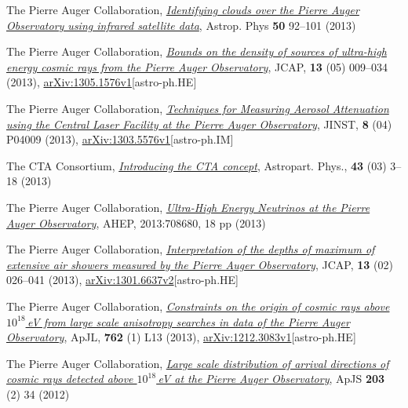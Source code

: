 \begin{etaremune}
\item {}The Pierre Auger Collaboration, \href{http://dx.doi.org/10.1016/j.astropartphys.2013.09.004}{\emph{Identifying clouds over the Pierre Auger Observatory using infrared satellite data}}, Astrop. Phys {\bf{50}} 92--101 (2013)

\item {}The Pierre Auger Collaboration, \href{http://dx.doi.org/10.1088/1475-7516/2013/05/009}{\emph{Bounds on the density of sources of ultra-high energy cosmic rays from the Pierre Auger Observatory}}, JCAP, {\bf{13}} (05) 009--034 (2013), \href{http://arxiv.org/abs/1305.1576}{arXiv:1305.1576v1}[astro-ph.HE]

\item {}The Pierre Auger Collaboration, \href{http://dx.doi.org/10.1088/1748-0221/8/04/P04009}{\emph{Techniques for Measuring Aerosol Attenuation using the Central Laser Facility at the Pierre Auger Observatory}}, JINST, {\bf{8}} (04) P04009 (2013), \href{http://arxiv.org/abs/1303.5576}{arXiv:1303.5576v1}[astro-ph.IM]

\item {}The CTA Consortium, \href{http://dx.doi.org/10.1016/j.astropartphys.2013.01.007}{\emph{Introducing the CTA concept}}, Astropart. Phys., {\bf{43}} (03) 3--18 (2013)

\item {}The Pierre Auger Collaboration, \href{http://dx.doi.org/10.1155/2013/708680
}{\emph{Ultra-High Energy Neutrinos at the Pierre Auger Observatory}}, AHEP, 2013:708680, 18 pp (2013)

\item {}The Pierre Auger Collaboration, \href{http://dx.doi.org/10.1088/1475-7516/2013/02/026}{\emph{Interpretation of the depths of maximum of extensive air showers measured by the Pierre Auger Observatory}}, JCAP, {\bf{13}} (02) 026--041 (2013), \href{http://arxiv.org/abs/1301.6637}{arXiv:1301.6637v2}[astro-ph.HE]

\item {}The Pierre Auger Collaboration, \href{http://dx.doi.org/10.1088/2041-8205/762/1/L13}{\emph{Constraints on the origin of cosmic rays above $10^{18}$\,eV from large scale anisotropy searches in data of the Pierre Auger Observatory}}, ApJL, {\bf{762}} (1) L13 (2013), \href{http://arxiv.org/abs/1212.3083}{arXiv:1212.3083v1}[astro-ph.HE]

\item {}The Pierre Auger Collaboration,
\href{http://dx.doi.org/10.1088/0067-0049/203/2/34}{\emph{Large scale
distribution of arrival directions of cosmic rays detected above $10^{18}$\,eV
at the Pierre Auger Observatory}}, ApJS {\bf{203}} (2) 34 (2012)


\end{etaremune}
